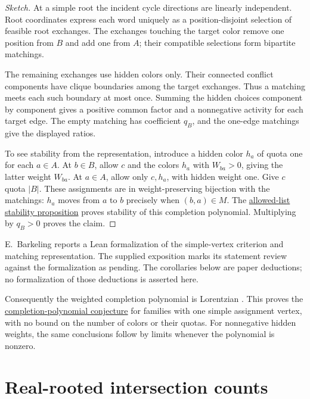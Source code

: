 \begin{proof}[Sketch]
At a simple root the incident cycle directions are linearly independent.
Root coordinates express each word uniquely as a position-disjoint
selection of feasible root exchanges. The exchanges touching the target
color remove one position from $B$ and add one from $A$; their compatible
selections form bipartite matchings.

The remaining exchanges use hidden colors only. Their connected conflict
components have clique boundaries among the target exchanges. Thus a
matching meets each such boundary at most once. Summing the hidden
choices component by component gives a positive common factor and a
nonnegative activity for each target edge. The empty matching has
coefficient $q_B$, and the one-edge matchings give the displayed ratios.

To see stability from the representation, introduce a hidden color $h_a$
of quota one for each $a\in A$. At $b\in B$, allow $c$ and the colors
$h_a$ with $W_{ba}>0$, giving the latter weight $W_{ba}$. At $a\in A$,
allow only $c,h_a$, with hidden weight one. Give $c$ quota $|B|$.
These assignments are in weight-preserving bijection with the matchings:
$h_a$ moves from $a$ to $b$ precisely when $(b,a)\in M$.
The \href{series-parallel.htm#listStability}{allowed-list stability
proposition} proves stability of this completion polynomial. Multiplying
by $q_B>0$ proves the claim.
\end{proof}

\begin{remark}
E.~Barkeling reports a Lean formalization of the simple-vertex
criterion and matching representation. The supplied exposition marks its
statement review against the formalization as pending. The corollaries
below are paper deductions; no formalization of those deductions is
asserted here.
\end{remark}

Consequently the weighted completion polynomial is Lorentzian
\cite[Proposition~2.2]{BrandenHuh2020}. This proves the
\href{rank.htm#lorentzianConjecture}{completion-polynomial conjecture}
for families with one simple assignment vertex, with no bound on the
number of colors or their quotas. For nonnegative hidden weights, the
same conclusions follow by limits whenever the polynomial is nonzero.

\section[stableIntersectionCounts]{Real-rooted intersection counts}

